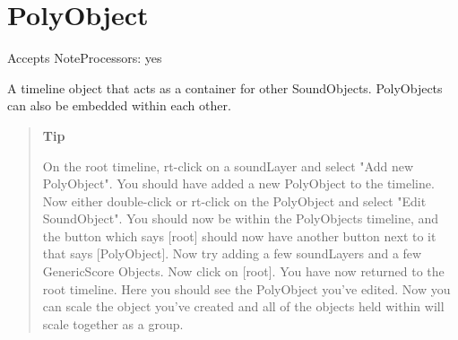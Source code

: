 \section{PolyObject}\label{polyObject}

Accepts NoteProcessors: yes

A timeline object that acts as a container for other SoundObjects.
PolyObjects can also be embedded within each other.

\begin{quote}
\textbf{Tip}

On the root timeline, rt-click on a soundLayer and select "Add new
PolyObject". You should have added a new PolyObject to the timeline. Now
either double-click or rt-click on the PolyObject and select "Edit
SoundObject". You should now be within the PolyObjects timeline, and the
button which says {[}root{]} should now have another button next to it
that says {[}PolyObject{]}. Now try adding a few soundLayers and a few
GenericScore Objects. Now click on {[}root{]}. You have now returned to
the root timeline. Here you should see the PolyObject you've edited. Now
you can scale the object you've created and all of the objects held
within will scale together as a group.
\end{quote}
